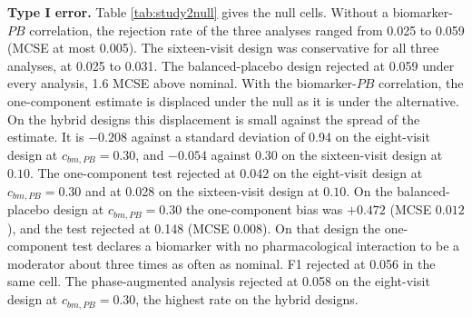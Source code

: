 \documentclass[
  11pt,
]{article}
\begin{document}
\begin{table}[H]
\centering
\caption{\label{tab:study2null}Corrected contamination study, null cells ($c_{bm} = 0$), 2,000 replicates per cell. Rejection rate of the bm:Dbc test at nominal level 0.05, with MCSE, and the one-component bias against the true value $0$.}
\centering
{}
\end{table}

\textbf{Type I error.} Table \ref{tab:study2null} gives the null cells.
Without a biomarker-\(PB\) correlation, the rejection rate of the three
analyses ranged from 0.025 to
0.059 (MCSE at most
0.005). The sixteen-visit
design was conservative for all three analyses, at
0.025 to
0.031. The
balanced-placebo design rejected at
0.059
under every analysis, 1.6
MCSE above nominal. With the biomarker-\(PB\) correlation, the
one-component estimate is displaced under the null as it is under the
alternative. On the hybrid designs this displacement is small against
the spread of the estimate. It is
\(-0.208\)
against a standard deviation of
0.94
on the eight-visit design at \(c_{bm,PB} = 0.30\), and
\(-0.054\)
against 0.30
on the sixteen-visit design at \(0.10\). The one-component test rejected at
0.042
on the eight-visit design at \(c_{bm,PB} = 0.30\) and at
0.028
on the sixteen-visit design at \(0.10\). On the balanced-placebo design at
\(c_{bm,PB} = 0.30\) the one-component bias was
\(+0.472\)
(MCSE
\(0.012\)),
and the test rejected at
0.148
(MCSE
0.008).
On that design the one-component test declares a biomarker with no
pharmacological interaction to be a moderator about three times as
often as nominal. F1 rejected at
0.056 in the
same cell. The phase-augmented analysis rejected at
0.058
on the eight-visit design at \(c_{bm,PB} = 0.30\), the highest rate on
the hybrid designs.
\end{document}
